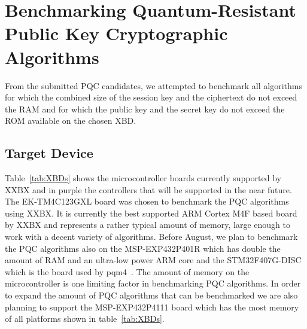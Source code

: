 \documentclass[10pt]{article}
\begin{document}
\section{Benchmarking Quantum-Resistant Public Key Cryptographic Algorithms}

From the submitted PQC candidates, we attempted to benchmark all algorithms for which the
combined size of the session key and the ciphertext do not exceed the RAM and for which the
public key and the secret key do not exceed the ROM available on the chosen XBD.

\subsection{Target Device}

Table~\ref{tab:XBDs} shows the microcontroller boards currently supported by XXBX and in 
{\color{purple}purple} the controllers that will be supported in the near future. 
The EK-TM4C123GXL board was chosen to benchmark the PQC algorithms using XXBX. 
It is currently the best supported ARM Cortex M4F based board by XXBX and represents a 
rather typical amount of memory, large enough to 
work with a decent variety of algorithms. 
Before August, we plan to benchmark the PQC algorithms also on the MSP-EXP432P401R 
which has double the amount of RAM and an ultra-low power ARM core and the
STM32F407G-DISC which is the board used by pqm4~\cite{PQM4}.
The amount of memory on the microcontroller is one limiting factor in benchmarking
PQC algorithms. In order to expand the amount of PQC algorithms that can be 
benchmarked we are also planning to support the MSP-EXP432P4111 board which has 
the most memory of all platforms shown in table~\ref{tab:XBDs}.
\end{document}
